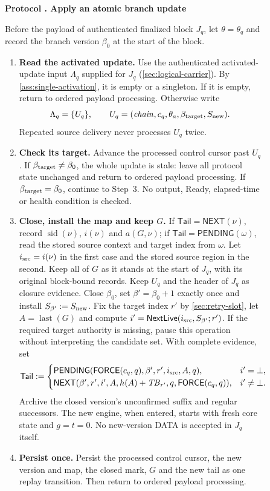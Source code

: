 \documentclass[11pt,a4paper]{article}
\newcommand{\TB}{\mathit{TB}}
\newcommand{\tagg}[1]{\ensuremath{\mathsf{#1}}}
\newcounter{protocol}
\newenvironment{protocol}[3][htbp]{\begin{figure}[#1]\refstepcounter{protocol}\label{#2}
\begin{mdframed}[linewidth=.6pt,skipabove=0pt,skipbelow=0pt,
innertopmargin=7pt,innerbottommargin=7pt]\small
\textbf{Protocol \theprotocol. #3}\par\smallskip}{\end{mdframed}\end{figure}}
\begin{document}
\begin{protocol}{alg:force}{Apply an atomic branch update}
Before the payload of authenticated finalized block $J_q$, let
$\theta=\theta_q$ and record the branch version $\beta_0$ at the start
of the block.
\begin{enumerate}[label=\textbf{\arabic*)},itemsep=3pt]
\item \textbf{Read the activated update.}
Use the authenticated activated-update input $\Lambda_q$ supplied for
$J_q$ (\cref{sec:logical-carrier}). By \cref{ass:single-activation}, it is empty
or a singleton. If it is empty, return to ordered payload processing.
Otherwise write
\[
 \Lambda_q=\{U_q\},\qquad
 U_q=(\mathit{chain},c_q,\theta_a,\beta_{\rm target},S_{\rm new}).
\]
Repeated source delivery never processes $U_q$ twice.

\item \textbf{Check its target.}
Advance the processed control cursor past $U_q$. If
$\beta_{\rm target}\ne\beta_0$, the whole update is stale: leave all
protocol state unchanged and return to ordered payload processing. If
$\beta_{\rm target}=\beta_0$, continue to Step~3. No output, Ready,
elapsed-time or health condition is checked.

\item \textbf{Close, install the map and keep $G$.}
If $\mathsf{Tail}=\tagg{NEXT}(\nu)$, record
$\operatorname{sid}(\nu)$, $i(\nu)$ and $a(G,\nu)$; if
$\mathsf{Tail}=\tagg{PENDING}(\omega)$, read the stored source context
and target index from $\omega$.  Let $i_{\rm src}=i(\nu)$ in the first
case and the stored source region in the second. Keep all of $G$ as it
stands at the start of $J_q$, with its original block-bound records. Keep
$U_q$ and the header of $J_q$ as closure evidence. Close $\beta_0$, set
$\beta'=\beta_0+1$ exactly once and install
$S_{\beta'}:=S_{\rm new}$. Fix the
target index $r'$ by \cref{sec:retry-slot}, let
$A=\operatorname{last}(G)$ and compute
$i'=\tagg{NextLive}(i_{\rm src},S_{\beta'};r')$. If the required target
authority is missing, pause this operation without interpreting the
candidate set. With complete evidence, set
\[
 \mathsf{Tail}:=
 \begin{cases}
 \tagg{PENDING}(\tagg{FORCE}(c_q,q),\beta',r',i_{\rm src},A,q),
   & i'=\bot,\\
 \tagg{NEXT}(\beta',r',i',A,h(A)+\TB_{r'},q,
              \tagg{FORCE}(c_q,q)),& i'\ne\bot.
 \end{cases}
\]
Archive the closed version's unconfirmed suffix and regular successors.
The new engine, when entered, starts with fresh core state and $g=t=0$.
No new-version DATA is accepted in $J_q$ itself.

\item \textbf{Persist once.}
Persist the processed control cursor, the new version and map, the closed
mark, $G$ and the new tail as one replay transition. Then return to
ordered payload processing.
\end{enumerate}
\end{protocol}
\end{document}
